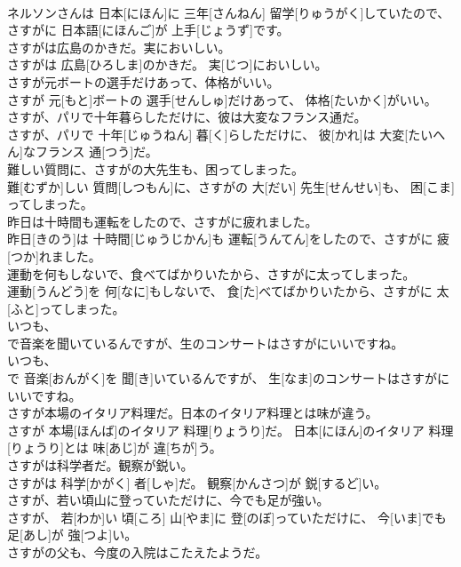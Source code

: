 \documentclass[8pt]{extreport}
\begin{document}
\begin{CJK}{UTF8}{min}
\\	ネルソンさんは 日本[にほん]に 三年[さんねん] 留学[りゅうがく]していたので、さすがに 日本語[にほんご]が 上手[じょうず]です。
\\	さすがは広島のかきだ。実においしい。	
\\	さすがは 広島[ひろしま]のかきだ。 実[じつ]においしい。
\\	さすが元ボートの選手だけあって、体格がいい。	
\\	さすが 元[もと]ボートの 選手[せんしゅ]だけあって、 体格[たいかく]がいい。
\\	さすが、パリで十年暮らしただけに、彼は大変なフランス通だ。	
\\	さすが、パリで 十年[じゅうねん] 暮[く]らしただけに、 彼[かれ]は 大変[たいへん]なフランス 通[つう]だ。
\\	難しい質問に、さすがの大先生も、困ってしまった。	
\\	難[むずか]しい 質問[しつもん]に、さすがの 大[だい] 先生[せんせい]も、 困[こま]ってしまった。
\\	昨日は十時間も運転をしたので、さすがに疲れました。	
\\	昨日[きのう]は 十時間[じゅうじかん]も 運転[うんてん]をしたので、さすがに 疲[つか]れました。
\\	運動を何もしないで、食べてばかりいたから、さすがに太ってしまった。	
\\	運動[うんどう]を 何[なに]もしないで、 食[た]べてばかりいたから、さすがに 太[ふと]ってしまった。
\\	いつも、
\\	で音楽を聞いているんですが、生のコンサートはさすがにいいですね。	
\\	いつも、 
\\	で 音楽[おんがく]を 聞[き]いているんですが、 生[なま]のコンサートはさすがにいいですね。
\\	さすが本場のイタリア料理だ。日本のイタリア料理とは味が違う。	
\\	さすが 本場[ほんば]のイタリア 料理[りょうり]だ。 日本[にほん]のイタリア 料理[りょうり]とは 味[あじ]が 違[ちが]う。
\\	さすがは科学者だ。観察が鋭い。	
\\	さすがは 科学[かがく] 者[しゃ]だ。 観察[かんさつ]が 鋭[するど]い。
\\	さすが、若い頃山に登っていただけに、今でも足が強い。	
\\	さすが、 若[わか]い 頃[ころ] 山[やま]に 登[のぼ]っていただけに、 今[いま]でも 足[あし]が 強[つよ]い。
\\	さすがの父も、今度の入院はこたえたようだ。	

\end{CJK}
\end{document}
